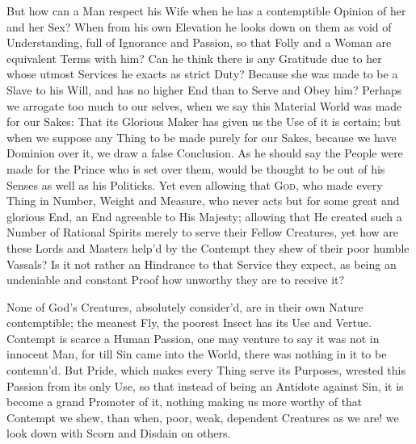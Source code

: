 But how can a Man respect his Wife when he has a contemptible Opinion
of her and her Sex? When from his own Elevation he looks down on them
as void of Understanding, full of Ignorance and Passion, so that Folly
and a Woman are equivalent Terms with him? Can he think there is any
Gratitude due to her whose utmost Services he exacts as strict Duty?
Because she was made to be a Slave to his Will, and has no higher End
than to Serve and Obey him? Perhaps we arrogate too much to our
selves, when we say this Material World was made for our Sakes: That
its Glorious Maker has given us the Use of it is certain; but when
we suppose any Thing to be made purely for our Sakes, because we have
Dominion over it, we draw a false Conclusion. As he should say the
People were made for the Prince who is set over them,  would
be thought to be out of his Senses as well as his Politicks. Yet
even allowing that \textsc{God}, who made every Thing in Number,
Weight and Measure, who never acts but for some great and glorious
End, an End agreeable to His Majesty; allowing that He created such a
Number of Rational Spirits merely to serve their Fellow Creatures, yet
how are these Lords and Masters help'd by the Contempt they shew of
their poor humble Vassals? Is it not rather an Hindrance to that
Service they expect, as being an undeniable and constant Proof how
unworthy they are to receive it?

None of God's Creatures, absolutely consider'd, are in their own
Nature contemptible; the meanest Fly, the poorest Insect has its Use
and Vertue. Contempt is scarce a Human Passion, one may venture to say
it was not in innocent Man, for till Sin came into the World, there
was nothing in it to be contemn'd. But Pride, which makes every Thing
serve its Purposes, wrested this Passion from  its only Use,
so that instead of being an Antidote against Sin, it is become a grand
Promoter of it, nothing making us more worthy of that Contempt we
shew, than when, poor, weak, dependent Creatures as we are! we look
down with Scorn and Disdain on others.


